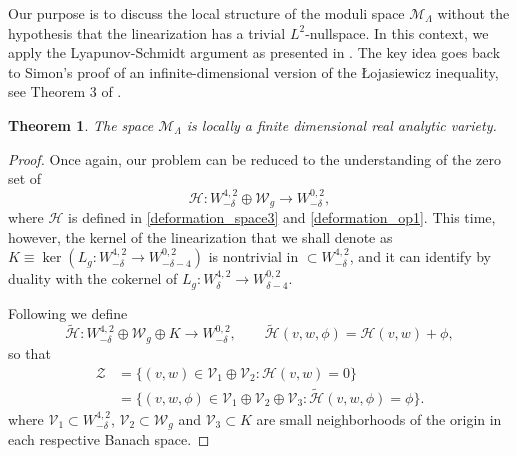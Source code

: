 \documentclass[reqno,11pt]{amsart}
\newtheorem{theorem}{Theorem}
\theoremstyle{tttheorem}
\begin{document}
Our purpose is to discuss the local structure of the moduli space $\mathcal{M}_{\Lambda}$ 
without the hypothesis that the linearization has a trivial $L^{2}$-nullspace. In this 
context, we apply the Lyapunov-Schmidt argument as presented in \cite{KMP}. The key idea 
goes back to Simon's proof of an infinite-dimensional version of the \L ojasiewicz
inequality, see Theorem 3 of \cite{Si}. 


\begin{theorem} The space $\mathcal{M}_{\Lambda}$ is locally a finite dimensional real analytic variety.
\end{theorem}

\begin{proof}
Once again, our problem can be reduced to the understanding of the zero set of 
$$\mathcal{H} : W^{4,2}_{-\delta} \oplus \mathcal{W}_g \rightarrow 
W^{0,2}_{-\delta}, $$
where $\mathcal{H}$ is defined in  \eqref{deformation_space3} and \eqref{deformation_op1}. 
This time, however, the kernel of the linearization that we shall denote as $K \equiv\ker \left (L_g: W^{4,2}_{-\delta} \rightarrow 
W^{0,2}_{-\delta-4}\right)$ is nontrivial in $ \subset W^{4,2}_{-\delta}$, and it can identify by duality with the cokernel of $L_g : W^{4,2}_\delta \rightarrow W^{0,2}_{\delta-4}.$

Following \cite{KMP} we define 
$$\widetilde{\mathcal{H}}: W^{4,2}_{-\delta} \oplus \mathcal{W}_g\oplus K 
\rightarrow W^{0,2}_{-\delta}, \qquad \widetilde{\mathcal{H}}(v,w,\phi) 
= \mathcal{H}(v,w) + \phi ,$$
so that 
\begin{align*}
\mathcal{Z} & = \{ (v,w) \in \mathcal{V}_1 \oplus \mathcal{V}_2 : 
\mathcal{H}(v,w) = 0 \} \\ & = \{ (v,w,\phi) \in \mathcal{V}_1 \oplus \mathcal{V}_2
\oplus \mathcal{V}_3 : \widetilde{\mathcal{H}} (v,w,\phi) = \phi \}.  
\end{align*}
where $\mathcal{V}_1\subset W^{4,2}_{-\delta}$, $\mathcal{V}_2 \subset 
\mathcal{W}_g$ and $\mathcal{V}_3\subset K$ are small neighborhoods of the origin in each respective Banach space. 


\end{proof}
\end{document}

